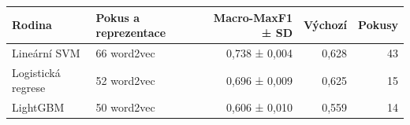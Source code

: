 \begin{tabular}{llrrr}
\toprule
Rodina & Pokus a reprezentace & Macro-MaxF1 ± SD & Výchozí & Pokusy\\
\midrule
Lineární SVM & 66 word2vec & 0,738 ± 0,004 & 0,628 & 43\\
Logistická regrese & 52 word2vec & 0,696 ± 0,009 & 0,625 & 15\\
LightGBM & 50 word2vec & 0,606 ± 0,010 & 0,559 & 14\\
\bottomrule
\end{tabular}
